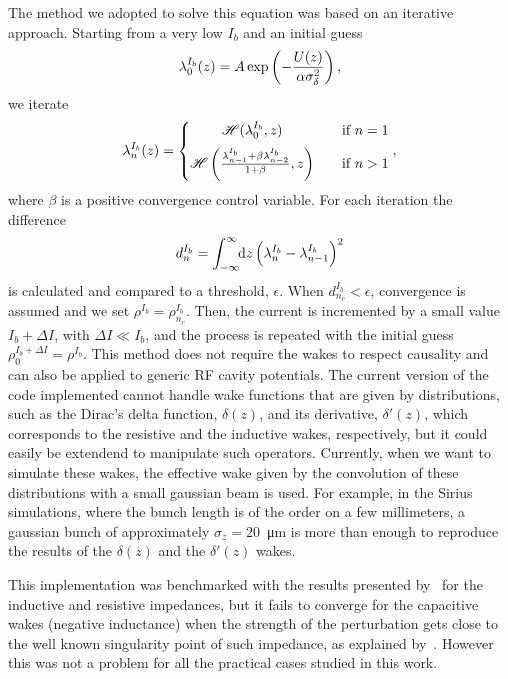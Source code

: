     The method we adopted to solve this equation was based on an iterative approach. Starting from a very low $I_b$ and an initial guess
    \begin{align}
        \lambda_0^{I_b}(z) = A\exp\left(-\frac{U(z)}{\alpha\sigma_\delta^2}\right),
    \end{align}
    we iterate
    \begin{align}
        \lambda_n^{I_b}(z) = \left\{
        \begin{matrix}
            \mathscr{H}(\lambda_0^{I_b},z)       & \quad \text{if } n = 1\\[2mm]
            \mathscr{H}\left(\frac{\lambda_{n-1}^{I_b} + \beta\lambda_{n-2}^{I_b}}{1+\beta},z\right) & \quad \text{if } n > 1
        \end{matrix}\right.,
    \end{align}
    where $\beta$ is a positive convergence control variable. For each iteration the difference
    \begin{align}
        d_n^{I_b} = \int_{-\infty}^{\infty}\!\!\text{d}z \left(\lambda_n^{I_b}-\lambda_{n-1}^{I_b}\right)^2
    \end{align}
    is calculated and compared to a threshold, $\epsilon$. When $d_{n_c}^{I_b}<\epsilon$, convergence is assumed and we set $\rho^{I_b} = \rho_{n_c}^{I_b}$. Then, the current is incremented by a small value $I_b + \Delta I$, with $\Delta I \ll I_b$, and the process is repeated with the initial guess $\rho_0^{I_b+\Delta I} = \rho^{I_b}$. This method does not require the wakes to respect causality and can also be applied to generic RF cavity potentials. The current version of the code implemented cannot handle wake functions that are given by distributions, such as the Dirac's delta function, $\delta(z)$, and its derivative, $\delta'(z)$, which corresponds to the resistive and the inductive wakes, respectively, but it could easily be extendend to manipulate such operators. Currently, when we want to simulate these wakes, the effective wake given by the convolution of these distributions with a small gaussian beam is used.
    For example, in the Sirius simulations, where the bunch length is of the order on a few millimeters, a gaussian bunch of approximately $\sigma_z=20$~\si{\micro\meter} is more than enough to reproduce the results of the $\delta(z)$ and the $\delta'(z)$ wakes.

    This implementation was benchmarked with the results presented by~ for the inductive and resistive impedances, but it fails to converge for the capacitive wakes (negative inductance) when the strength of the perturbation gets close to the well known singularity point of such impedance, as explained by~. However this was not a problem for all the practical cases studied in this work.

